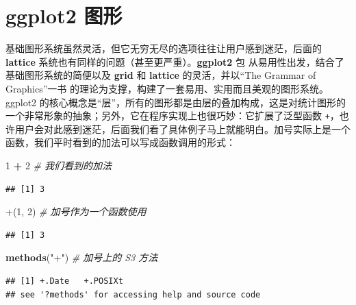 \documentclass[
  b5paper,
  UTF8,twoside]{book}
\newenvironment{Shaded}{\begin{snugshade}}{\end{snugshade}}
\newcommand{\AttributeTok}[1]{\textcolor[rgb]{0.13,0.29,0.53}{#1}}
\newcommand{\CommentTok}[1]{\textcolor[rgb]{0.56,0.35,0.01}{\textit{#1}}}
\newcommand{\DecValTok}[1]{\textcolor[rgb]{0.00,0.00,0.81}{#1}}
\newcommand{\FunctionTok}[1]{\textcolor[rgb]{0.13,0.29,0.53}{\textbf{#1}}}
\newcommand{\NormalTok}[1]{#1}
\newcommand{\SpecialCharTok}[1]{\textcolor[rgb]{0.81,0.36,0.00}{\textbf{#1}}}
\newcommand{\StringTok}[1]{\textcolor[rgb]{0.31,0.60,0.02}{#1}}
\begin{document}
\section{ggplot2 图形}\label{sec:ggplot2}

基础图形系统虽然灵活，但它无穷无尽的选项往往让用户感到迷茫，后面的 \textbf{lattice} 系统也有同样的问题（甚至更严重）。\textbf{ggplot2} 包 \citep{ggplot2} 从易用性出发，结合了基础图形系统的简便以及 \textbf{grid} 和 \textbf{lattice} 的灵活，并以``The Grammar of Graphics''一书 \citep{Wilkinson05} 的理论为支撑，构建了一套易用、实用而且美观的图形系统。ggplot2 的核心概念是``层''，所有的图形都是由层的叠加构成，这是对统计图形的一个非常形象的抽象；另外，它在程序实现上也很巧妙：它扩展了泛型函数 \texttt{+}，也许用户会对此感到迷茫，后面我们看了具体例子马上就能明白。加号实际上是一个函数，我们平时看到的加法可以写成函数调用的形式：

\begin{Shaded}
\begin{Highlighting}[]
\DecValTok{1} \SpecialCharTok{+} \DecValTok{2} \CommentTok{\# 我们看到的加法}
\end{Highlighting}
\end{Shaded}

\begin{verbatim}
## [1] 3
\end{verbatim}

\begin{Shaded}
\begin{Highlighting}[]
\StringTok{\textasciigrave{}}\AttributeTok{+}\StringTok{\textasciigrave{}}\NormalTok{(}\DecValTok{1}\NormalTok{, }\DecValTok{2}\NormalTok{) }\CommentTok{\# 加号作为一个函数使用}
\end{Highlighting}
\end{Shaded}

\begin{verbatim}
## [1] 3
\end{verbatim}

\begin{Shaded}
\begin{Highlighting}[]
\FunctionTok{methods}\NormalTok{(}\StringTok{"+"}\NormalTok{) }\CommentTok{\# 加号上的 S3 方法}
\end{Highlighting}
\end{Shaded}

\begin{verbatim}
## [1] +.Date   +.POSIXt
## see '?methods' for accessing help and source code
\end{verbatim}
\end{document}
